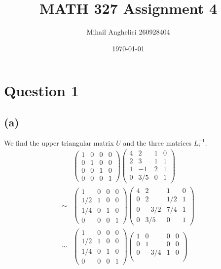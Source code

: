 \documentclass[12pt]{article}
\title{MATH 327 Assignment 4}
\author{Mihail Anghelici 260928404 }
\date{\today}
\begin{document}
	\maketitle
	\section*{Question 1}
		\subsection*{(a)}
		We find the upper triangular matrix $U$ and the three matrices $L_{i}^{-1}$.
			\begin{align*}
				&\begin{pmatrix}
					1 & 0 & 0 & 0 \\
					0 & 1 & 0 & 0 \\
					0 & 0 & 1 & 0 \\
					0 & 0 & 0 & 1 
				\end{pmatrix}
				\begin{pmatrix}
				4 & 2 & 1 & 0 \\ 
				2 & 3 & 1 & 1 \\
				1 & -1 & 2 & 1 \\
				0 & 3/5 & 0 & 1 
				\end{pmatrix} \\
				\sim &\begin{pmatrix}
				1 & 0 & 0 & 0 \\
				1/2 & 1 & 0 & 0 \\
				1/4 & 0 & 1 & 0 \\
				0 & 0 & 0 & 1 
				\end{pmatrix}
				\begin{pmatrix}
				4 & 2 & 1 & 0 \\ 
				0 & 2 & 1/2 & 1 \\
				0 & -3/2 & 7/4 & 1 \\
				0 & 3/5 & 0 & 1 
				\end{pmatrix} \\
				\sim&\begin{pmatrix}
				1 & 0 & 0 & 0 \\
				1/2 & 1 & 0 & 0 \\
				1/4 & 0 & 1 & 0 \\
				0 & 0 & 0 & 1 
				\end{pmatrix}
				\begin{pmatrix}
				1 & 0 & 0 & 0 \\
				0 & 1 & 0 & 0 \\
				0 & -3/4 & 1 & 0 \\

\end{pmatrix}
\end{align*}
\end{document}
